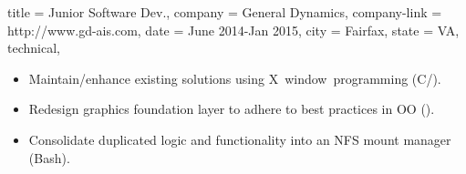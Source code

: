 \begin{position}
  {
    title   = Junior Software Dev.,
    company = General Dynamics,
    company-link = http://www.gd-ais.com,
    date    = June 2014-Jan 2015,
    city    = Fairfax,
    state   = VA,
    technical,
  }

\begin{itemize}
\item Maintain/enhance existing solutions using X~window~programming (C/\CPP).
\item Redesign graphics foundation layer to adhere to best practices in OO (\CPP).
\item Consolidate duplicated logic and functionality into an NFS mount manager (Bash).
\end{itemize}
\end{position}

